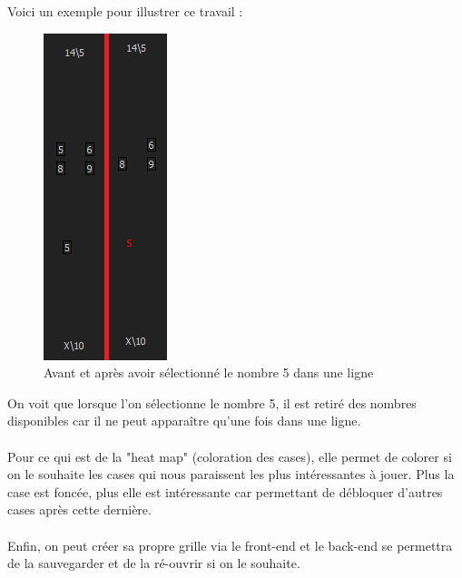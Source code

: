 \documentclass[12pt]{article}
\begin{document}
\newpage
Voici un exemple pour illustrer ce travail : 
\begin{figure}[ht]
  \begin{center}
    \includegraphics[scale=0.5]{./ressources/retrait.png} 
  \end{center}
  \caption{Avant et après avoir sélectionné le nombre 5 dans une ligne}
\end{figure} 

On voit que lorsque l'on sélectionne le nombre 5, il est retiré des nombres disponibles car il ne peut apparaître qu'une fois dans une ligne. \\ \\
Pour ce qui est de la "heat map" (coloration des cases), elle permet de colorer si on le souhaite les cases qui nous paraissent les plus intéressantes à jouer. Plus la case est foncée, plus elle est intéressante car permettant de débloquer d'autres cases après cette dernière. \\ \\
Enfin, on peut créer sa propre grille via le front-end et le back-end se permettra de la sauvegarder et de la ré-ouvrir si on le souhaite. 
\newpage
\end{document}
